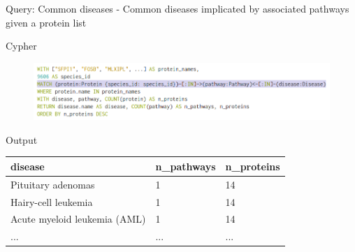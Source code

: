 \documentclass{beamer}
\begin{document}
\begin{frame}{Query: Common diseases}
- Common diseases implicated by associated pathways given a protein list
\begin{block}{Cypher}
\begin{figure}
    \centering
    \includegraphics[width=\linewidth]{common_diseases_query.png}
\end{figure}
\end{block}
\vfill
\begin{block}{Output}
\small
\begin{tabular}{|l|l|l|}
    \hline
    disease & n\_pathways & n\_proteins\\ \hline \hline
    Pituitary adenomas & 1 & 14 \\ \hline
    Hairy-cell leukemia & 1 & 14 \\ \hline
    Acute myeloid leukemia (AML) & 1 & 14 \\ \hline
    ... & ... & ...\\
    \hline
\end{tabular}
\end{block}
\end{frame}
\end{document}

